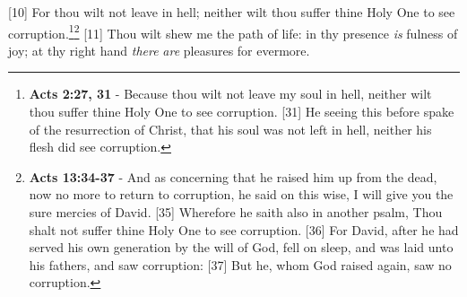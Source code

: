 [10] \textcolor[cmyk]{0.99998,1,0,0}{For thou wilt not leave  in hell; neither wilt thou suffer thine Holy One to see corruption.}\footnote{\textbf{Acts 2:27, 31} - Because thou wilt not leave my soul in hell, neither wilt thou suffer thine Holy One to see corruption. [31] He seeing this before spake of the resurrection of Christ, that his soul was not left in hell, neither his flesh did see corruption.}\footnote{\textbf{Acts 13:34-37} - And as concerning that he raised him up from the dead, now no more to return to corruption, he said on this wise, I will give you the sure mercies of David. [35] Wherefore he saith also in another psalm, Thou shalt not suffer thine Holy One to see corruption. [36] For David, after he had served his own generation by the will of God, fell on sleep, and was laid unto his fathers, and saw corruption: [37] But he, whom God raised again, saw no corruption.}
[11] \textcolor[cmyk]{0.99998,1,0,0}{Thou wilt shew me the path of life: in thy presence \emph{is} fulness of joy; at thy right hand \emph{there} \emph{are} pleasures for evermore.}

